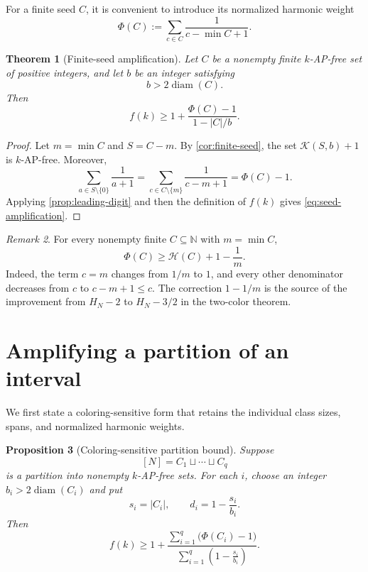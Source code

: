 \documentclass[11pt]{article}
\newtheorem{theorem}{Theorem}[section]
\newtheorem{proposition}[theorem]{Proposition}
\theoremstyle{definition}
\theoremstyle{remark}
\newtheorem{remark}[theorem]{Remark}
\newcommand{\N}{\mathbb{N}}
\newcommand{\HH}{\mathcal{H}}
\newcommand{\Kemp}{\mathcal{K}}
\newcommand{\diam}{\operatorname{diam}}
\begin{document}
For a finite seed $C$, it is convenient to introduce its normalized
harmonic weight
\begin{equation}\label{eq:phi-def}
 \Phi(C):=
 \sum_{c\in C}\frac1{c-\min C+1}.
\end{equation}

\begin{theorem}[Finite-seed amplification]\label{thm:seed-amplification}
Let $C$ be a nonempty finite $k$-AP-free set of positive integers, and let
$b$ be an integer satisfying
\[
 b>2\diam(C).
\]
Then
\begin{equation}\label{eq:seed-amplification}
 f(k)\ge
 1+\frac{\Phi(C)-1}{1-|C|/b}.
\end{equation}
\end{theorem}

\begin{proof}
Let $m=\min C$ and $S=C-m$.  By \cref{cor:finite-seed}, the set
$\Kemp(S,b)+1$ is $k$-AP-free.  Moreover,
\[
 \sum_{a\in S\setminus\{0\}}\frac1{a+1}
 =
 \sum_{c\in C\setminus\{m\}}\frac1{c-m+1}
 =\Phi(C)-1.
\]
Applying \cref{prop:leading-digit} and then the definition of $f(k)$ gives
\cref{eq:seed-amplification}.
\end{proof}

\begin{remark}\label{rem:shift-benefit}
For every nonempty finite $C\subseteq\N$ with $m=\min C$,
\begin{equation}\label{eq:phi-vs-h}
 \Phi(C)
 \ge
 \HH(C)+1-\frac1m.
\end{equation}
Indeed, the term $c=m$ changes from $1/m$ to $1$, and every other
denominator decreases from $c$ to $c-m+1\le c$.  The correction
$1-1/m$ is the source of the improvement from $H_N-2$ to $H_N-3/2$ in the
two-color theorem.
\end{remark}

\section{Amplifying a partition of an interval}

We first state a coloring-sensitive form that retains the individual class
sizes, spans, and normalized harmonic weights.

\begin{proposition}[Coloring-sensitive partition bound]\label{prop:partition-sensitive}
Suppose
\[
 [N]=C_1\sqcup\cdots\sqcup C_q
\]
is a partition into nonempty $k$-AP-free sets.  For each $i$, choose an
integer $b_i>2\diam(C_i)$ and put
\[
 s_i=|C_i|,
 \qquad
 d_i=1-\frac{s_i}{b_i}.
\]
Then
\begin{equation}\label{eq:partition-sensitive}
 f(k)\ge
 1+\frac{\displaystyle\sum_{i=1}^q\bigl(\Phi(C_i)-1\bigr)}
          {\displaystyle\sum_{i=1}^q\left(1-\frac{s_i}{b_i}\right)}.
\end{equation}
\end{proposition}
\end{document}
